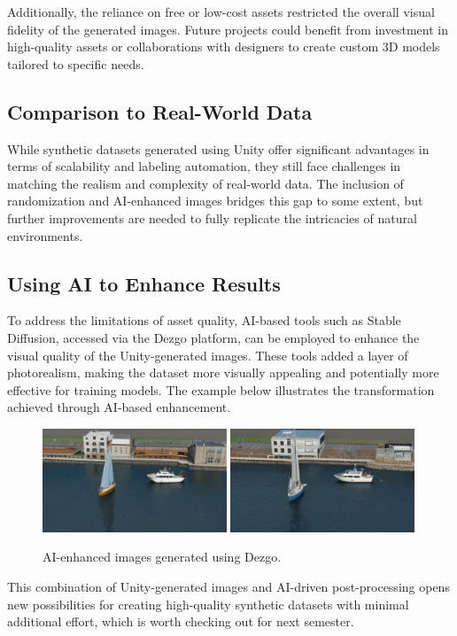 \noindent Additionally, the reliance on free or low-cost assets restricted the overall visual fidelity of the generated images. Future projects could benefit from investment in high-quality assets or collaborations with designers to create custom 3D models tailored to specific needs.

\subsection{Comparison to Real-World Data}
While synthetic datasets generated using Unity offer significant advantages in terms of scalability and labeling automation, they still face challenges in matching the realism and complexity of real-world data. The inclusion of randomization and AI-enhanced images bridges this gap to some extent, but further improvements are needed to fully replicate the intricacies of natural environments.

\subsection{Using AI to Enhance Results}
To address the limitations of asset quality, AI-based tools such as Stable Diffusion, accessed via the Dezgo platform, can be employed to enhance the visual quality of the Unity-generated images. These tools added a layer of photorealism, making the dataset more visually appealing and potentially more effective for training models. The example below illustrates the transformation achieved through AI-based enhancement.
\begin{figure}[H]
\centering
\includegraphics[width=0.49\textwidth]{Figures/photorealistic_3613113118.png}
\includegraphics[width=0.49\textwidth]{Figures/photorealistic_2942539231.png}
\caption{AI-enhanced images generated using Dezgo.}
\label{fig:ai_enhanced}
\end{figure}

This combination of Unity-generated images and AI-driven post-processing opens new possibilities for creating high-quality synthetic datasets with minimal additional effort, which is worth checking out for next semester.
